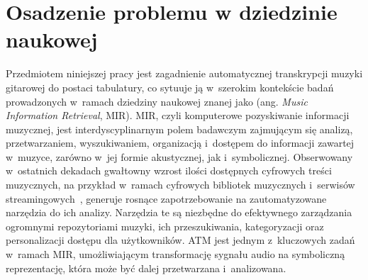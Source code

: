 \section{Osadzenie problemu w dziedzinie naukowej}
\label{sec:osadzenie_problemu}

Przedmiotem niniejszej pracy jest zagadnienie automatycznej transkrypcji muzyki gitarowej do postaci tabulatury, co sytuuje ją w~szerokim kontekście badań prowadzonych w~ramach dziedziny naukowej znanej jako (ang. \textit{Music Information Retrieval}, MIR). MIR, czyli komputerowe pozyskiwanie informacji muzycznej, jest interdyscyplinarnym polem badawczym zajmującym się analizą, przetwarzaniem, wyszukiwaniem, organizacją i~dostępem do informacji zawartej w~muzyce, zarówno w~jej formie akustycznej, jak i~symbolicznej. Obserwowany w~ostatnich dekadach gwałtowny wzrost ilości dostępnych cyfrowych treści muzycznych, na przykład w~ramach cyfrowych bibliotek muzycznych i~serwisów streamingowych~\autocite{Benetos2019AutomaticMusicTranscription}, generuje rosnące zapotrzebowanie na zautomatyzowane narzędzia do ich analizy. Narzędzia te są niezbędne do efektywnego zarządzania ogromnymi repozytoriami muzyki, ich przeszukiwania, kategoryzacji oraz personalizacji dostępu dla użytkowników. ATM jest jednym z~kluczowych zadań w~ramach MIR, umożliwiającym transformację sygnału audio na symboliczną reprezentację, która może być dalej przetwarzana i~analizowana.

